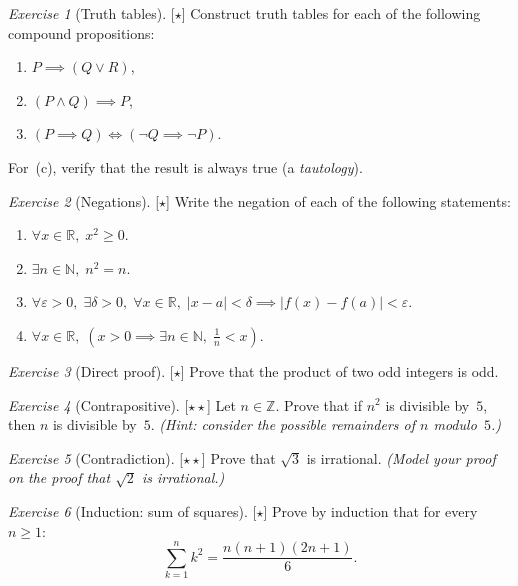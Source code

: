 \documentclass[12pt,a4paper,openany]{book}
\newcommand{\N}{\mathbb{N}}
\newcommand{\Z}{\mathbb{Z}}
\newcommand{\R}{\mathbb{R}}
\newcommand{\eps}{\varepsilon}
\newcommand{\abs}[1]{\left\lvert #1 \right\rvert}
\theoremstyle{definition}
\theoremstyle{remark}
\newtheorem{exercise}{Exercise}[chapter]
\newcommand{\easy}{\textnormal{[$\star$]}}
\newcommand{\medium}{\textnormal{[$\star\star$]}}
\begin{document}
\begin{exercise}[Truth tables]\label{exo:truth-tables}\easy
{}
Construct truth tables for each of the following compound propositions:
\begin{enumerate}[label=(\alph*)]
  \item $P \implies (Q \lor R)$,
  \item $(P \land Q) \implies P$,
  \item $(P \implies Q) \iff (\neg Q \implies \neg P)$.
\end{enumerate}
For~(c), verify that the result is always true (a \emph{tautology}).
\end{exercise}

\begin{exercise}[Negations]\label{exo:negations}\easy
{}
Write the negation of each of the following statements:
\begin{enumerate}[label=(\alph*)]
  \item $\forall x \in \R,\; x^2 \geq 0$.
  \item $\exists n \in \N,\; n^2 = n$.
  \item $\forall \eps > 0,\; \exists \delta > 0,\; \forall x \in \R,\;
    \abs{x-a}<\delta \implies \abs{f(x)-f(a)}<\eps$.
  \item $\forall x \in \R,\; (x > 0 \implies \exists n \in \N,\;
    \frac{1}{n} < x)$.
\end{enumerate}
\end{exercise}

\begin{exercise}[Direct proof]\label{exo:direct1}\easy
Prove that the product of two odd integers is odd.
\end{exercise}

\begin{exercise}[Contrapositive]\label{exo:contra1}\medium
Let $n \in \Z$.  Prove that if $n^2$ is divisible by~$5$, then $n$ is
divisible by~$5$.  \textit{(Hint: consider the possible remainders of $n$
modulo~$5$.)}
\end{exercise}

\begin{exercise}[Contradiction]\label{exo:contra2}\medium
Prove that $\sqrt{3}$ is irrational.  \textit{(Model your proof on the
proof that $\sqrt{2}$ is irrational.)}
\end{exercise}

\begin{exercise}[Induction: sum of squares]\label{exo:ind-squares}\easy
Prove by induction that for every $n \geq 1$:
\[
  \sum_{k=1}^{n} k^2 = \frac{n(n+1)(2n+1)}{6}.
\]
\end{exercise}
\end{document}
